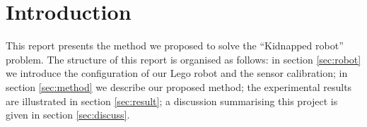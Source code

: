 \section*{Introduction}


This report presents the method we proposed to solve the ``Kidnapped robot'' problem. The structure of this report is organised as follows: in section \ref{sec:robot} we introduce the configuration of our Lego robot and the sensor calibration; in section \ref{sec:method} we describe our proposed method; the experimental results are illustrated in section \ref{sec:result}; a discussion summarising this project is given in section \ref{sec:discuss}.

